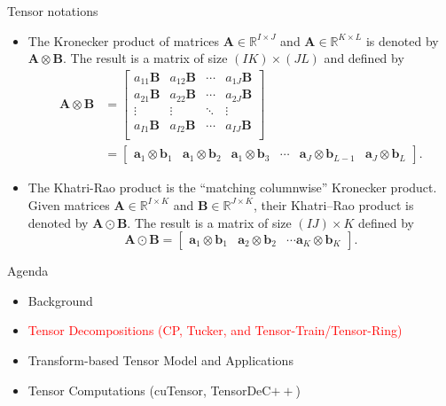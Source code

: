 \documentclass[t, 10pt, handout, aspectratio=169]{beamer}
\begin{document}
\begin{frame}{Tensor notations}
\begin{itemize}
\item The Kronecker product of matrices $\mathbf{A}\in\mathbb{R}^{I\times J}$ and $\mathbf{A}\in\mathbb{R}^{K\times L}$ is denoted by $\mathbf{A} \otimes \mathbf{B}$.  The result is a matrix of size $(IK) \times (JL)$ and defined by
$$
\begin{aligned}
\mathbf{A} \otimes \mathbf{B} &= 
\left[\begin{matrix}
a_{11}\mathbf{B} & a_{12}\mathbf{B} & \cdots & a_{1J}\mathbf{B}\\
a_{21}\mathbf{B} & a_{22}\mathbf{B} & \cdots & a_{2J}\mathbf{B}\\
\vdots & \vdots & \ddots & \vdots\\
a_{I1}\mathbf{B} & a_{I2}\mathbf{B} & \cdots & a_{IJ}\mathbf{B}\\
\end{matrix}\right] \\
&=
\left[\begin{matrix}
\mathbf{a}_1\otimes\mathbf{b}_1 & \mathbf{a}_1\otimes\mathbf{b}_2 & \mathbf{a}_1\otimes\mathbf{b}_3 & \cdots & \mathbf{a}_J\otimes\mathbf{b}_{L-1} & \mathbf{a}_J\otimes\mathbf{b}_L
\end{matrix}\right].
\end{aligned}
$$
\item The Khatri-Rao product is the ``matching columnwise'' Kronecker product. Given matrices $\mathbf{A} \in \mathbb{R}^{I\times K}$ and $\mathbf{B} \in \mathbb{R}^{J\times K}$, their Khatri–Rao product is denoted by $\mathbf{A} \odot \mathbf{B}$. The result is a matrix of size $(IJ) \times K$ defined by
$$
\mathbf{A}\odot\mathbf{B}=
\left[\begin{matrix}
\mathbf{a}_1\otimes\mathbf{b}_1 & \mathbf{a}_2\otimes\mathbf{b}_2 & \cdots \mathbf{a}_K\otimes\mathbf{b}_K
\end{matrix}\right].
$$
\end{itemize}
\end{frame}

\begin{frame}{Agenda}
\begin{itemize}
    \large \item {Background}
    \large \item \textcolor{red}{Tensor Decompositions (CP, Tucker, and Tensor-Train/Tensor-Ring)}
    \large \item{Transform-based Tensor Model and Applications}
    \large \item{Tensor Computations (cuTensor, TensorDeC$++$)}
\end{itemize}
\end{frame}
\end{document}
